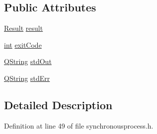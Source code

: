\subsection*{Public Attributes}
\begin{DoxyCompactItemize}
\item 
\hyperlink{struct_utils_1_1_synchronous_process_response_aa7b2d882cf93d074f4392e57a6603f2c}{Result} \hyperlink{struct_utils_1_1_synchronous_process_response_a292da97b1219d5bf29bdcc96ddeaee91}{result}
\item 
\hyperlink{ioapi_8h_a787fa3cf048117ba7123753c1e74fcd6}{int} \hyperlink{struct_utils_1_1_synchronous_process_response_addc9fc8217e8275e96b9426afc976a21}{exit\-Code}
\item 
\hyperlink{group___u_a_v_objects_plugin_gab9d252f49c333c94a72f97ce3105a32d}{Q\-String} \hyperlink{struct_utils_1_1_synchronous_process_response_a84040de73bca35b34e0d0f0069c849b5}{std\-Out}
\item 
\hyperlink{group___u_a_v_objects_plugin_gab9d252f49c333c94a72f97ce3105a32d}{Q\-String} \hyperlink{struct_utils_1_1_synchronous_process_response_a328fa8fa6a704de6827a005d7e00bd82}{std\-Err}
\end{DoxyCompactItemize}


\subsection{Detailed Description}


Definition at line 49 of file synchronousprocess.\-h.



